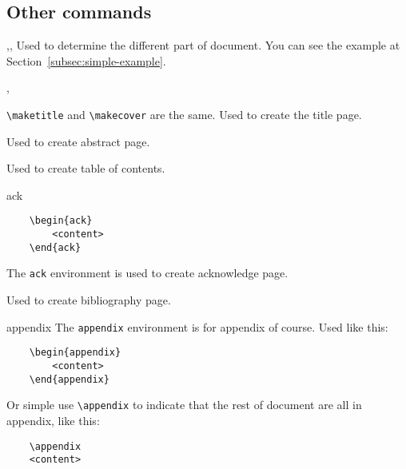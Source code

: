 \documentclass[12pt,a4paper,numbered,full]{l3doc}
\begin{document}
\subsection{Other commands}

\begin{function}{\frontmatter,\mainmatter,\backmatter}
    Used to determine the different part of document. You can see the example at Section~\ref{subsec:simple-example}.
\end{function}

\begin{function}{\maketitle,\makecover}
    \verb+\maketitle+ and \verb+\makecover+ are the same. Used to create the title page.
\end{function}

\begin{function}{\makeabstract}
    Used to create abstract page.
\end{function}

\begin{function}{\tableofcontents}
    Used to create table of contents.
\end{function}

\begin{environment}{ack}
    \begin{verbatim}
    \begin{ack}
        <content>
    \end{ack}
    \end{verbatim}
    The \verb+ack+ environment is used to create acknowledge page.
\end{environment}

\begin{function}{}
    \begin{syntax}
    \end{syntax}
    Used to create bibliography page.
\end{function}

\begin{environment}{appendix}
    The \verb+appendix+ environment is for appendix of course. Used like this:
    \begin{verbatim}
    \begin{appendix}
        <content>
    \end{appendix}
    \end{verbatim}
\begin{function}{\appendix}
    Or simple use \verb+\appendix+ to indicate that the rest of document are all in appendix, like this:
    \begin{verbatim}
    \appendix
    <content>
    \end{verbatim}
\end{function}
\end{environment}
\end{document}
